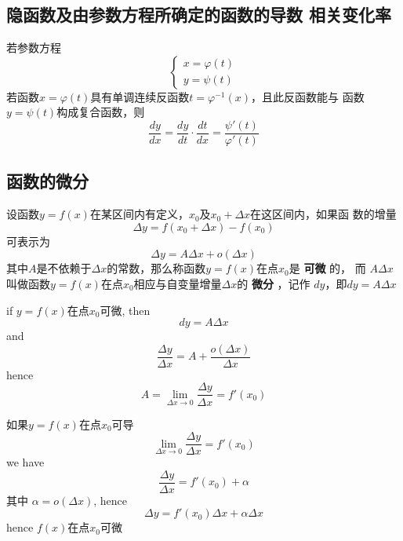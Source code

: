 \documentclass[11pt]{article}
\begin{document}
\subsection{隐函数及由参数方程所确定的函数的导数 相关变化率}
\label{sec:orgd7206eb}

若参数方程
\begin{equation*}
\begin{cases}
x=\varphi(t)\\
y=\psi(t)
\end{cases}
\end{equation*}
若函数\(x=\varphi(t)\)具有单调连续反函数\(t=\varphi^{-1}(x)\)，且此反函数能与
函数\(y=\psi(t)\)构成复合函数，则
\begin{equation*}
\frac{dy}{dx}=\frac{dy}{dt}\cdot\frac{dt}{dx}=\frac{\psi'(t)}{\varphi'(t)}
\end{equation*}
\subsection{函数的微分}
\label{sec:orgd741c5a}
\begin{definition}[]
设函数\(y=f(x)\)在某区间内有定义，\(x_0\)及\(x_0+\Delta x\)在这区间内，如果函
数的增量
\begin{equation*}
\Delta y=f(x_0+\Delta x)-f(x_0)
\end{equation*}
可表示为
\begin{equation*}
\Delta y=A\Delta x+o(\Delta x)
\end{equation*}
其中\(A\)是不依赖于\(\Delta x\)的常数，那么称函数\(y=f(x)\)在点\(x_0\)是 \textbf{可微} 的，
而 \(A\Delta x\) 叫做函数\(y=f(x)\)在点\(x_0\)相应与自变量增量\(\Delta x\)的 \textbf{微分}
，记作 \(dy\)，即\(dy=A\Delta x\)
\end{definition}

if \(y=f(x)\)在点\(x_0\)可微, then
\begin{equation*}
dy=A\Delta x
\end{equation*}
and
\begin{equation*}
\frac{\Delta y}{\Delta x}=A+\frac{o(\Delta x)}{\Delta x}
\end{equation*}
hence
\begin{equation*}
A=\lim_{\Delta x\to0}\frac{\Delta y}{\Delta x}=f'(x_0)
\end{equation*}

如果\(y=f(x)\)在点\(x_0\)可导
\begin{equation*}
\lim_{\Delta x\to0}\frac{\Delta y}{\Delta x}=f'(x_0)
\end{equation*}
we have
\begin{equation*}
\frac{\Delta y}{\Delta x}=f'(x_0)+\alpha
\end{equation*}
其中 \(\alpha=o(\Delta x)\), hence
\begin{equation*}
\Delta y=f'(x_0)\Delta x+\alpha\Delta x
\end{equation*}
hence \(f(x)\)在点\(x_0\)可微
\end{document}
